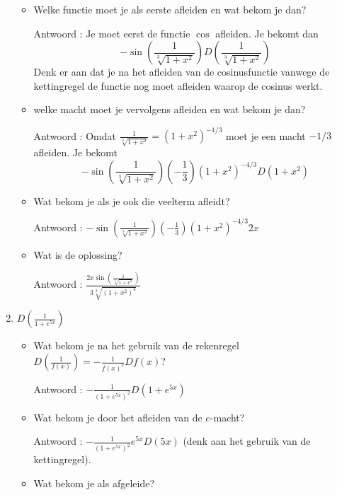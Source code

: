 \begin{enumerate}
	\begin{itemize}
		
		\item Welke functie moet je als eerste afleiden en wat bekom je dan?
		
		Antwoord : Je moet eerst de functie $\cos$ afleiden. Je bekomt dan
		\[
		-\sin \left(  \frac{1}{\sqrt[3]{1+x^2}} \right) D \left(  \frac{1}{\sqrt[3]{1+x^2}} \right) 
		\]
		Denk er aan dat je na het afleiden van de cosinusfunctie vanwege de kettingregel de functie nog moet afleiden waarop de cosinus werkt.
		
		\item welke macht moet je vervolgens afleiden en wat bekom je dan?
		
		Antwoord : Omdat $\frac{1}{\sqrt[3]{1+x^2}}=\left( 1+x^2  \right)^{-1/3}$ moet je een macht $-1/3$ afleiden. Je bekomt
		\[
		-\sin \left(  \frac{1}{\sqrt[3]{1+x^2}} \right) \left( -\frac{1}{3}  \right) \left( 1+x^2  \right)^{-4/3}D\left( 1+x^2  \right)
		\]
		
		\item Wat bekom je als je ook die veelterm afleidt?
		
		Antwoord : $-\sin \left(  \frac{1}{\sqrt[3]{1+x^2}} \right) \left( -\frac{1}{3}  \right) \left( 1+x^2  \right)^{-4/3}2x$
		
		\item Wat is de oplossing?
		
		Antwoord : $\frac {2x\sin \left( \frac {1}{\sqrt[3]{1+x^2}} \right)}{3 \sqrt[3]{\left( 1+x^2  \right) ^4}}$
		
	\end{itemize}
	
	\item $D \left( \frac {1}{1+e^{5x}} \right)$
	
	\begin{itemize}
		
		\item Wat bekom je na het gebruik van de rekenregel $D \left( \frac{1}{f(x)} \right)=-\frac {1}{f(x)^2}Df(x)$?
		
		Antwoord : $-\frac{1}{\left( 1+e^{5x}  \right)^2}D \left ( 1+e^{5x} \right)$
		
		\item Wat bekom je door het afleiden van de $e$-macht?
		
		Antwoord : $-\frac{1}{\left( 1+e^{5x}  \right)^2}e^{5x}D(5x)$ (denk aan het gebruik van de kettingregel).
		
		\item Wat bekom je als afgeleide?
		

\end{itemize}
\end{enumerate}
